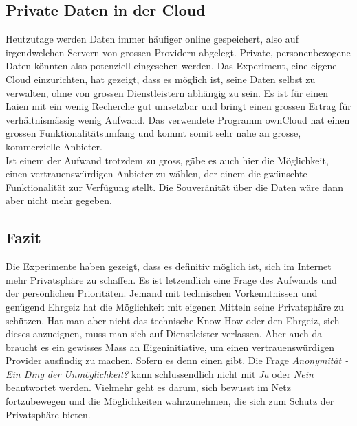 \subsection{Private Daten in der Cloud}
Heutzutage werden Daten immer häufiger online gespeichert, also auf irgendwelchen Servern von grossen Providern abgelegt.
Private, personenbezogene Daten könnten also potenziell eingesehen werden. Das Experiment, eine eigene Cloud einzurichten, hat gezeigt, dass es möglich ist, seine Daten selbst zu verwalten, ohne von grossen Dienstleistern abhängig zu sein.
Es ist für einen Laien mit ein wenig Recherche gut umsetzbar und bringt einen grossen Ertrag für verhältnismässig wenig Aufwand.
Das verwendete Programm ownCloud hat einen grossen Funktionalitätsumfang und kommt somit sehr nahe an grosse, kommerzielle Anbieter.
\\
Ist einem der Aufwand trotzdem zu gross, gäbe es auch hier die Möglichkeit, einen vertrauenswürdigen Anbieter zu wählen, der einem die gwünschte Funktionalität zur Verfügung stellt.
Die Souveränität über die Daten wäre dann aber nicht mehr gegeben.

\subsection{Fazit}
Die Experimente haben gezeigt, dass es definitiv möglich ist, sich im Internet mehr Privatsphäre zu schaffen.
Es ist letzendlich eine Frage des Aufwands und der persönlichen Prioritäten. Jemand mit technischen Vorkenntnissen und genügend Ehrgeiz hat die Möglichkeit mit eigenen Mitteln seine Privatsphäre zu schützen. Hat man aber nicht das technische Know-How oder den Ehrgeiz, sich dieses anzueignen, muss man sich auf Dienstleister verlassen. Aber auch da braucht es ein gewisses Mass an Eigeninitiative, um einen vertrauenswürdigen Provider ausfindig zu machen. Sofern es denn einen gibt.
Die Frage \textit{Anonymität - Ein Ding der Unmöglichkeit?} kann schlussendlich nicht mit \textit{Ja} oder \textit{Nein} beantwortet werden. Vielmehr geht es darum, sich bewusst im Netz fortzubewegen und die Möglichkeiten wahrzunehmen, die sich zum Schutz der Privatsphäre bieten.
